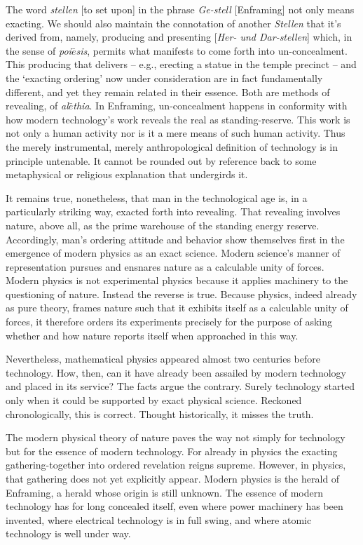 \documentclass[paper=a4, fontsize=11pt,twoside]{scrartcl}
\begin{document}
The word \textit{stellen} [to set upon] in the phrase \textit{Ge-stell} [Enframing] not only means exacting. We should also maintain the connotation of another \textit{Stellen} that it's derived from, namely, producing and presenting [\textit{Her- und Dar-stellen}] which, in the sense of \textit{poi$\bar{e}$sis}, permits what manifests to come forth into un-concealment. This producing that delivers -- e.g., erecting a statue in the temple precinct -- and the `exacting ordering' now under consideration are in fact fundamentally different, and yet they remain related in their essence. Both are methods of revealing, of \textit{al$\bar{e}$thia}. In Enframing, un-concealment happens in conformity with how modern technology's work reveals the real as standing-reserve. This work is not only a human activity nor is it a mere means of such human activity. Thus the merely instrumental, merely anthropological definition of technology is in principle untenable. It cannot be rounded out by reference back to some metaphysical or religious explanation that undergirds it.

It remains true, nonetheless, that man in the technological age is, in a particularly striking way, exacted forth into revealing. That revealing involves nature, above all, as the prime warehouse of the standing energy reserve. Accordingly, man's ordering attitude and behavior show themselves first in the emergence of modern physics as an exact science. Modern science's manner of representation pursues and ensnares nature as a calculable unity of forces. Modern physics is not experimental physics because it applies machinery to the questioning of nature. Instead the reverse is true. Because physics, indeed already as pure theory, frames nature such that it exhibits itself as a calculable unity of forces, it therefore orders its experiments precisely for the purpose of asking whether and how nature reports itself when approached in this way.

Nevertheless, mathematical physics appeared almost two centuries before technology. How, then, can it have already been assailed by modern technology and placed in its service? The facts argue the contrary. Surely technology started only when it could be supported by exact physical science. Reckoned chronologically, this is correct. Thought historically, it misses the truth.

The modern physical theory of nature paves the way not simply for technology but for the essence of modern technology. For already in physics the exacting gathering-together into ordered revelation reigns supreme. However, in physics, that gathering does not yet explicitly appear. Modern physics is the herald of Enframing, a herald whose origin is still unknown. The essence of modern technology has for long concealed itself, even where power machinery has been invented, where electrical technology is in full swing, and where atomic technology is well under way.
\end{document}

